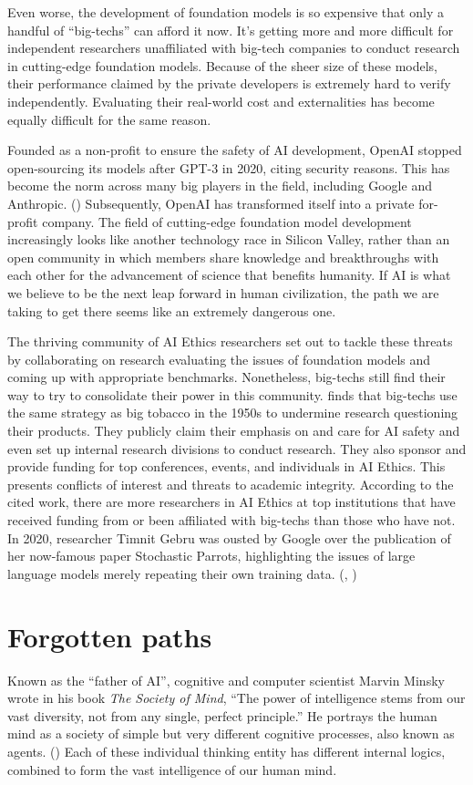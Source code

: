 \documentclass[12pt]{article}
\begin{document}
Even worse, the development of foundation models is so expensive that only a handful of ``big-techs'' can afford it now. It's getting more and more difficult for independent researchers unaffiliated with big-tech companies to conduct research in cutting-edge foundation models. Because of the sheer size of these models, their performance claimed by the private developers is extremely hard to verify independently. Evaluating their real-world cost and externalities has become equally difficult for the same reason.

Founded as a non-profit to ensure the safety of AI development, OpenAI stopped open-sourcing its models after GPT-3 in 2020, citing security reasons. This has become the norm across many big players in the field, including Google and Anthropic. (\cite{empire}) Subsequently, OpenAI has transformed itself into a private for-profit company. The field of cutting-edge foundation model development increasingly looks like another technology race in Silicon Valley, rather than an open community in which members share knowledge and breakthroughs with each other for the advancement of science that benefits humanity. If AI is what we believe to be the next leap forward in human civilization, the path we are taking to get there seems like an extremely dangerous one.

The thriving community of AI Ethics researchers set out to tackle these threats by collaborating on research evaluating the issues of foundation models and coming up with appropriate benchmarks. Nonetheless, big-techs still find their way to try to consolidate their power in this community. \cite{10.1145/3461702.3462563} finds that big-techs use the same strategy as big tobacco in the 1950s to undermine research questioning their products. They publicly claim their emphasis on and care for AI safety and even set up internal research divisions to conduct research. They also sponsor and provide funding for top conferences, events, and individuals in AI Ethics. This presents conflicts of interest and threats to academic integrity. According to the cited work, there are more researchers in AI Ethics at top institutions that have received funding from or been affiliated with big-techs than those who have not. In 2020, researcher Timnit Gebru was ousted by Google over the publication of her now-famous paper Stochastic Parrots, highlighting the issues of large language models merely repeating their own training data. (\cite{empire}, \cite{parrots})

\section{Forgotten paths} \label{alternatives}
Known as the ``father of AI'', cognitive and computer scientist Marvin Minsky wrote in his book \textit{The Society of Mind}, ``The power of intelligence stems from our vast diversity, not from any single, perfect principle.'' He portrays the human mind as a society of simple but very different cognitive processes, also known as agents. (\cite{societyofmind}) Each of these individual thinking entity has different internal logics, combined to form the vast intelligence of our human mind.
\end{document}
